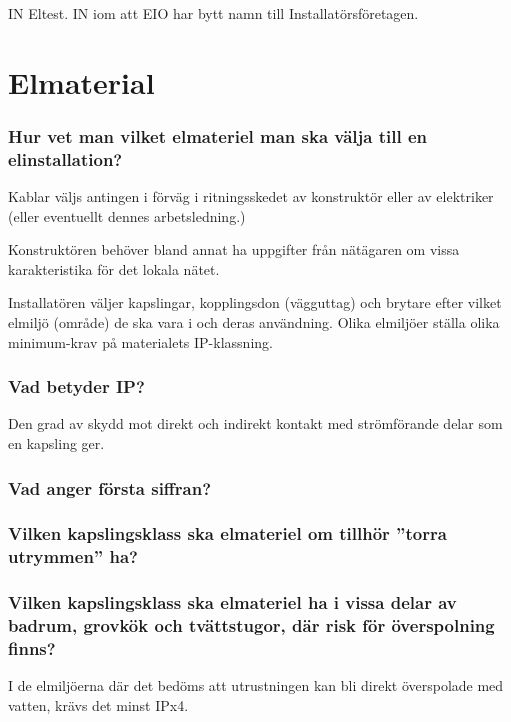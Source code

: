 \documentclass[a4paper,swedish]{article}
\begin{document}
IN Eltest. IN iom att EIO har bytt namn till Installatörsföretagen.

\part{Elmaterial}

\setcounter{section}{0}
\section{Hur vet man vilket elmateriel man ska välja till en elinstallation?}

Kablar väljs antingen i förväg i ritningsskedet av konstruktör eller av
elektriker (eller eventuellt dennes arbetsledning.)

Konstruktören behöver bland annat ha uppgifter från nätägaren om vissa karakteristika
för det lokala nätet.

Installatören väljer kapslingar, kopplingsdon (vägguttag) och brytare efter vilket elmiljö (område)
de ska vara i och deras användning. Olika elmiljöer ställa olika minimum-krav på materialets IP-klassning.

\setcounter{section}{2}
\section{Vad betyder IP?}

Den grad av skydd mot direkt och indirekt kontakt med strömförande delar som en kapsling ger.

\setcounter{section}{4}
\section{Vad anger första siffran?}

\setcounter{section}{6}
\section{Vilken kapslingsklass ska elmateriel om tillhör ”torra utrymmen” ha?}

\setcounter{section}{8}
\section{Vilken kapslingsklass ska elmateriel ha i vissa delar av badrum, grovkök och
  tvättstugor, där risk för överspolning finns?}

I de elmiljöerna där det bedöms att utrustningen kan bli direkt överspolade med vatten, krävs det minst IPx4.
\end{document}
